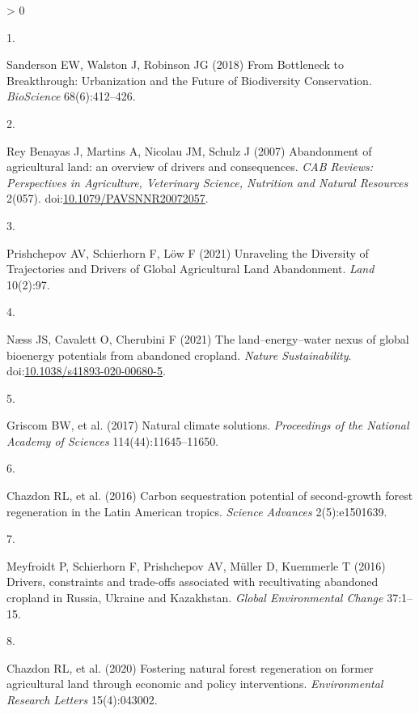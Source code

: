 \documentclass[9pt,twocolumn,twoside,]{pnas-new}
\newlength{\csllabelwidth}
\newlength{\cslhangindent}
\newenvironment{CSLReferences}[2] %
 {%
  \setlength{\parindent}{0pt}
  \ifodd #1 \everypar{\setlength{\hangindent}{\cslhangindent}}\ignorespaces\fi
  \ifnum #2 > 0
  \setlength{\parskip}{#2\baselineskip}
  \fi
 }%
 {}
\newcommand{\CSLLeftMargin}[1]{\parbox[t]{\csllabelwidth}{#1}}
\newcommand{\CSLRightInline}[1]{\parbox[t]{\linewidth - \csllabelwidth}{#1}\break}
\begin{document}
\hypertarget{refs}{}
\begin{CSLReferences}{0}{0}
\leavevmode\hypertarget{ref-Sanderson2018}{}%
\CSLLeftMargin{1. }
\CSLRightInline{Sanderson EW, Walston J, Robinson JG (2018) {From Bottleneck to Breakthrough: Urbanization and the Future of Biodiversity Conservation}. \emph{BioScience} 68(6):412--426.}

\leavevmode\hypertarget{ref-ReyBenayas2007}{}%
\CSLLeftMargin{2. }
\CSLRightInline{Rey Benayas J, Martins A, Nicolau JM, Schulz J (2007) {Abandonment of agricultural land: an overview of drivers and consequences.} \emph{CAB Reviews: Perspectives in Agriculture, Veterinary Science, Nutrition and Natural Resources} 2(057). doi:\href{https://doi.org/10.1079/PAVSNNR20072057}{10.1079/PAVSNNR20072057}.}

\leavevmode\hypertarget{ref-Prishchepov2021}{}%
\CSLLeftMargin{3. }
\CSLRightInline{Prishchepov AV, Schierhorn F, Löw F (2021) {Unraveling the Diversity of Trajectories and Drivers of Global Agricultural Land Abandonment}. \emph{Land} 10(2):97.}

\leavevmode\hypertarget{ref-Naess2021}{}%
\CSLLeftMargin{4. }
\CSLRightInline{Næss JS, Cavalett O, Cherubini F (2021) {The land--energy--water nexus of global bioenergy potentials from abandoned cropland}. \emph{Nature Sustainability}. doi:\href{https://doi.org/10.1038/s41893-020-00680-5}{10.1038/s41893-020-00680-5}.}

\leavevmode\hypertarget{ref-Griscom2017}{}%
\CSLLeftMargin{5. }
\CSLRightInline{Griscom BW, et al. (2017) {Natural climate solutions}. \emph{Proceedings of the National Academy of Sciences} 114(44):11645--11650.}

\leavevmode\hypertarget{ref-Chazdon2016a}{}%
\CSLLeftMargin{6. }
\CSLRightInline{Chazdon RL, et al. (2016) {Carbon sequestration potential of second-growth forest regeneration in the Latin American tropics}. \emph{Science Advances} 2(5):e1501639.}

\leavevmode\hypertarget{ref-Meyfroidt2016}{}%
\CSLLeftMargin{7. }
\CSLRightInline{Meyfroidt P, Schierhorn F, Prishchepov AV, Müller D, Kuemmerle T (2016) {Drivers, constraints and trade-offs associated with recultivating abandoned cropland in Russia, Ukraine and Kazakhstan}. \emph{Global Environmental Change} 37:1--15.}

\leavevmode\hypertarget{ref-Chazdon2020}{}%
\CSLLeftMargin{8. }
\CSLRightInline{Chazdon RL, et al. (2020) {Fostering natural forest regeneration on former agricultural land through economic and policy interventions}. \emph{Environmental Research Letters} 15(4):043002.}


\end{CSLReferences}
\end{document}
